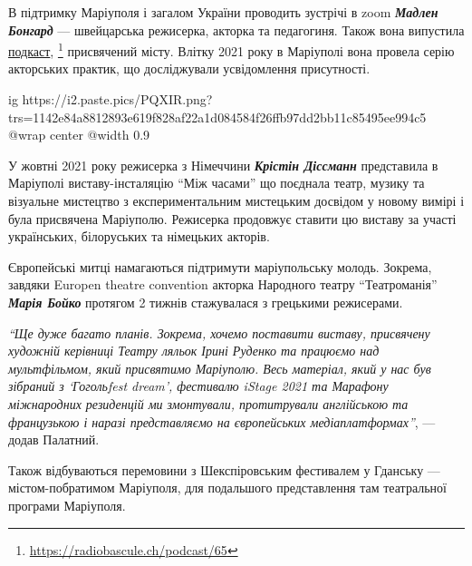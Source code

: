 
В підтримку Маріуполя і загалом України проводить зустрічі в zoom \emph{\textbf{Мадлен
Бонгард}} — швейцарська режисерка, акторка та педагогиня. Також вона випустила
\href{https://radiobascule.ch/podcast/65}{подкаст},%
\footnote{\url{https://radiobascule.ch/podcast/65}}
 присвячений місту. Влітку 2021 року в Маріуполі вона провела серію
акторських практик, що досліджували усвідомлення присутності.

\ifcmt
  ig https://i2.paste.pics/PQXIR.png?trs=1142e84a8812893e619f828af22a1d084584f26ffb97dd2bb11c85495ee994c5
  @wrap center
  @width 0.9
\fi


У жовтні 2021 року режисерка з Німеччини \emph{\textbf{Крістін Діссманн}} представила в
Маріуполі виставу-інсталяцію \enquote{Між часами} що поєднала театр, музику та
візуальне мистецтво з експериментальним мистецьким досвідом у новому вимірі і
була присвячена Маріуполю. Режисерка продовжує ставити цю виставу за участі
українських, білоруських та німецьких акторів.

Європейські митці намагаються підтримути маріупольську молодь. Зокрема, завдяки
Europen theatre convention акторка Народного театру \enquote{Театроманія} \emph{\textbf{Марія Бойко}}
протягом 2 тижнів стажувалася з грецькими режисерами.


\begin{leftbar}
\emph{\enquote{Ще дуже багато планів. Зокрема, хочемо поставити виставу, присвячену
художній керівниці Театру ляльок Ірині Руденко та працюємо над
мультфільмом, який присвятимо Маріуполю. Весь матеріал, який у нас був
зібраний з \enquote{Гогольfest dream}, фестивалю iStage 2021 та Марафону
міжнародних резиденцій ми змонтували, протитрували англійською та
французькою і наразі представляємо на європейських медіаплатформах}}, —
додав Палатний.
\end{leftbar}

Також відбуваються перемовини з Шекспіровським фестивалем у Гданську —
містом-побратимом Маріуполя, для подальшого представлення там театральної
програми Маріуполя.

